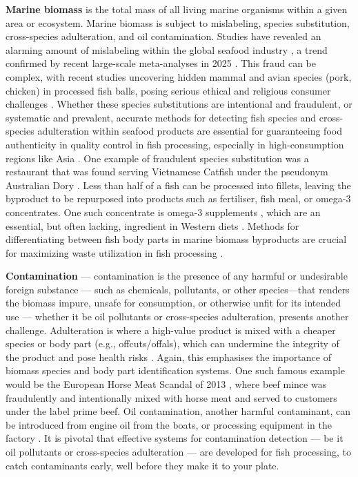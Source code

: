 \textbf{Marine biomass} is the total mass of all living marine organisms within a given area or ecosystem.
Marine biomass is subject to mislabeling, species substitution, cross-species adulteration, and oil contamination. Studies have revealed an alarming amount of mislabeling within the global seafood industry \citep{Pardo2016}, a trend confirmed by recent large-scale meta-analyses in 2025 \citep{Ahles2025, Marin2025}. This fraud can be complex, with recent studies uncovering hidden mammal and avian species (pork, chicken) in processed fish balls, posing serious ethical and religious consumer challenges \citep{Zhang2025}. Whether these species substitutions are intentional and fraudulent, or systematic and prevalent, accurate methods for detecting fish species and cross-species adulteration within seafood products are essential for guaranteeing food authenticity in quality control in fish processing, especially in high-consumption regions like Asia \citep{Do2025}. One example of fraudulent species substitution was a restaurant that was found serving Vietnamese Catfish under the pseudonym Australian Dory \citep{Australia2016}. Less than half of a fish can be processed into fillets, leaving the byproduct to be repurposed into products such as fertiliser, fish meal, or omega-3 concentrates. One such concentrate is omega-3 supplements \citep{Simopoulos2011}, which are an essential, but often lacking, ingredient in Western diets \citep{FAO2020}.
Methods for differentiating between fish body parts in marine biomass byproducts are crucial for maximizing waste utilization in fish processing \citep{Stevens2018}.

\textbf{Contamination} --- contamination is the presence of any harmful or undesirable foreign substance — such as chemicals, pollutants, or other species—that renders the biomass impure, unsafe for consumption, or otherwise unfit for its intended use ---
whether it be oil pollutants or cross-species adulteration, presents another challenge. Adulteration is where a high-value product is mixed with a cheaper species or body part (e.g., offcuts/offals), which can undermine the integrity of the product and pose health risks \citep{Black2019}. Again, this emphasises the importance of biomass species and body part identification systems. One such famous example would be the European Horse Meat Scandal of 2013 \citep{Premanandh2013}, where beef mince was fraudulently and intentionally mixed with horse meat and served to customers under the label prime beef. Oil contamination, another harmful contaminant, can be introduced from engine oil from the boats, or processing equipment in the factory \citep{Moens2003}.
It is pivotal that effective systems for contamination detection --- be it oil pollutants or cross-species adulteration --- are developed for fish processing, to catch contaminants early, well before they make it to your plate.

